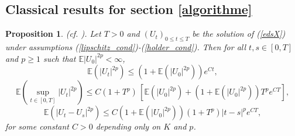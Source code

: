\documentclass[a4paper, 11pt]{article}
\newtheorem{prop}{Proposition}
\newcommand{\E}{\mathbb{E}}
\newcommand{\1}{\mathbf{1}}
\begin{document}
\subsection{Classical results for section \ref{algorithme}}
\begin{prop}(cf. \cite{friedman}).
\label{estimeesclassiques} 
Let $T>0$ and $(U_t)_{0\leq t\leq T}$ be the solution of (\ref{edsX}) under assumptions (\ref{lipschitz_cond})-(\ref{holder_cond}). Then for all $t, s\in [0,T]$ and $p\geq 1$ such that $\E|U_0|^{2p}<\infty$,
\begin{equation}
\label{eq:11}
\E(|U_t|^{2p})\leq \left(1+\E(|U_0|^{2p})\right)e^{Ct},
\end{equation}
\begin{equation}
\label{eq:17}
\E(\sup_{t\in [0,T]}|U_t|^{2p})\leq C(1+T^p)\, [\E(|U_0|^{2p})+\left(1+\E(|U_0|^{2p})\right)T^p e^{CT}],
\end{equation}
\begin{equation}
\label{Kolmogorovcriterion}
\E(|U_t-U_s|^{2p})\leq C\left(1+\E(|U_0|^{2p})\right)(1+T^p)|t-s|^p e^{CT},
\end{equation}
for some constant $C>0$ depending only on $K$ and $p$.
\end{prop}




\bigskip
\end{document}
